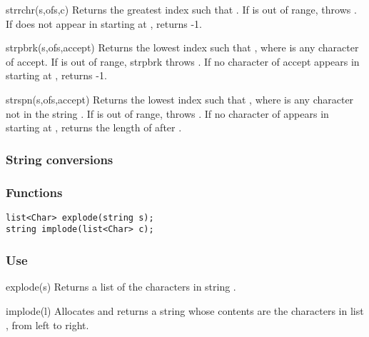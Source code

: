 \begin{defun}{strrchr}{(s,ofs,c)}
Returns the greatest index  such that
.  If  is out of range,
 throws .  If
 does not appear in  starting at , 
returns -1.
\end{defun}

\begin{defun}{strpbrk}{(s,ofs,accept)}
Returns the lowest index  such that
, where  is any character of
accept.  If  is out of range, strpbrk throws
.  If no character of accept
appears in  starting at ,  returns -1.
\end{defun}

\begin{defun}{strspn}{(s,ofs,accept)}
Returns the lowest index  such that
, where  is any character not
in the string .  If  is out of range, 
throws .  If no character of
 appears in  starting at , 
returns the length of  after .
\end{defun}


\subsubsection*{String conversions}
\subsubsection*{Functions}
\begin{verbatim}
list<Char> explode(string s);
string implode(list<Char> c);
\end{verbatim}

\subsubsection*{Use}

\begin{defun}{explode}{(s)}
Returns a list of the characters in string .
\end{defun}

\begin{defun}{implode}{(l)}
Allocates and returns a string whose contents are the characters in list
, from left to right.
\end{defun}

